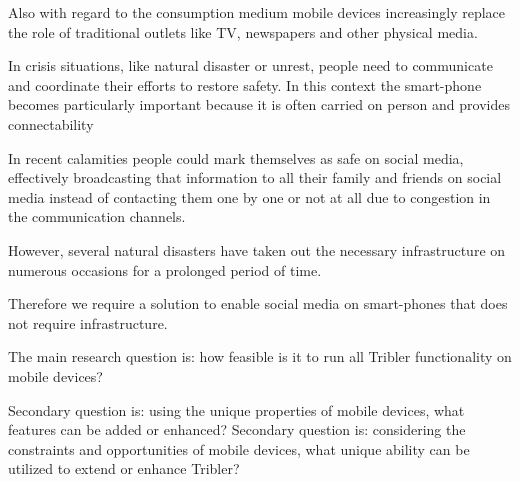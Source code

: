 Also with regard to the consumption medium mobile devices increasingly replace the role of traditional outlets like TV, newspapers and other physical media.

In crisis situations, like natural disaster or unrest, people need to communicate and coordinate their efforts to restore safety.
In this context the smart-phone becomes particularly important because it is often carried on person and provides connectability

In recent calamities \cite{earthquake-nepal, etc...} people could mark themselves as safe on social media, effectively broadcasting that information to all their family and friends on social media instead of contacting them one by one or not at all due to congestion in the communication channels.

However, several natural disasters have taken out the necessary infrastructure on numerous occasions for a prolonged period of time. %

Therefore we require a solution to enable social media on smart-phones that does not require infrastructure. %




The main research question is: how feasible is it to run all Tribler functionality on mobile devices? %

Secondary question is: using the unique properties of mobile devices, what features can be added or enhanced?
Secondary question is: considering the constraints and opportunities of mobile devices, what unique ability can be utilized to extend or enhance Tribler?
